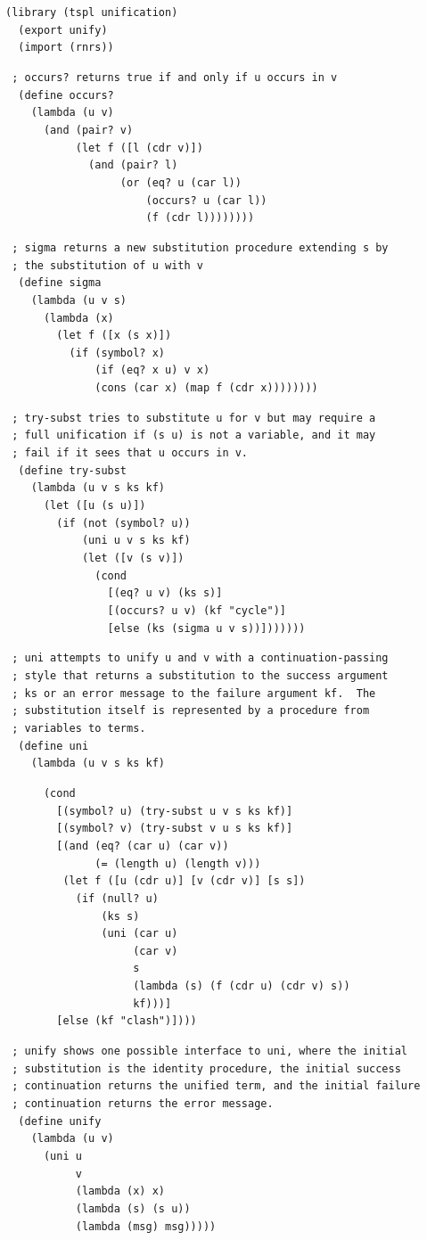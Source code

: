 \begin{alltt}
(library (tspl unification)
  (export unify)
  (import (rnrs))

 ; occurs? returns true if and only if u occurs in v
  (define occurs?
    (lambda (u v)
      (and (pair? v)
           (let f ([l (cdr v)])
             (and (pair? l)
                  (or (eq? u (car l))
                      (occurs? u (car l))
                      (f (cdr l))))))))

 ; sigma returns a new substitution procedure extending s by
 ; the substitution of u with v
  (define sigma
    (lambda (u v s)
      (lambda (x)
        (let f ([x (s x)])
          (if (symbol? x)
              (if (eq? x u) v x)
              (cons (car x) (map f (cdr x))))))))

 ; try-subst tries to substitute u for v but may require a
 ; full unification if (s u) is not a variable, and it may
 ; fail if it sees that u occurs in v.
  (define try-subst
    (lambda (u v s ks kf)
      (let ([u (s u)])
        (if (not (symbol? u))
            (uni u v s ks kf)
            (let ([v (s v)])
              (cond
                [(eq? u v) (ks s)]
                [(occurs? u v) (kf "cycle")]
                [else (ks (sigma u v s))]))))))

 ; uni attempts to unify u and v with a continuation-passing
 ; style that returns a substitution to the success argument
 ; ks or an error message to the failure argument kf.  The
 ; substitution itself is represented by a procedure from
 ; variables to terms.
  (define uni
    (lambda (u v s ks kf)

      (cond
        [(symbol? u) (try-subst u v s ks kf)]
        [(symbol? v) (try-subst v u s ks kf)]
        [(and (eq? (car u) (car v))
              (= (length u) (length v)))
         (let f ([u (cdr u)] [v (cdr v)] [s s])
           (if (null? u)
               (ks s)
               (uni (car u)
                    (car v)
                    s
                    (lambda (s) (f (cdr u) (cdr v) s))
                    kf)))]
        [else (kf "clash")])))

 ; unify shows one possible interface to uni, where the initial
 ; substitution is the identity procedure, the initial success
 ; continuation returns the unified term, and the initial failure
 ; continuation returns the error message.
  (define unify
    (lambda (u v)
      (uni u
           v
           (lambda (x) x)
           (lambda (s) (s u))
           (lambda (msg) msg)))))
\end{alltt}

